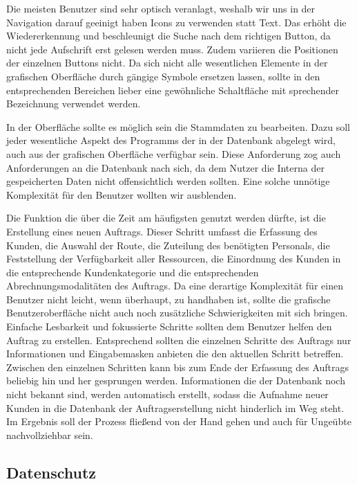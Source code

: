 \documentclass[12pt]{article}
\begin{document}
Die meisten Benutzer sind sehr optisch veranlagt, weshalb wir uns in der Navigation darauf geeinigt haben Icons zu verwenden statt Text. Das erhöht die Wiedererkennung und beschleunigt die Suche nach dem richtigen Button, da nicht jede Aufschrift erst gelesen werden muss. Zudem variieren die Positionen der einzelnen Buttons nicht. Da sich nicht alle wesentlichen Elemente in der grafischen Oberfläche durch gängige Symbole ersetzen lassen, sollte in den entsprechenden Bereichen lieber eine gewöhnliche Schaltfläche mit sprechender Bezeichnung verwendet werden.
\newline

In der Oberfläche sollte es möglich sein die Stammdaten zu bearbeiten. Dazu soll jeder wesentliche Aspekt des Programms der in der Datenbank abgelegt wird, auch aus der grafischen Oberfläche verfügbar sein. Diese Anforderung zog auch Anforderungen an die Datenbank nach sich, da dem Nutzer die Interna der gespeicherten Daten nicht offensichtlich werden sollten. Eine solche unnötige Komplexität für den Benutzer wollten wir ausblenden.
\newline

Die Funktion die über die Zeit am häufigsten genutzt werden dürfte, ist die Erstellung eines neuen Auftrags. Dieser Schritt umfasst die Erfassung des Kunden, die Auswahl der Route, die Zuteilung des benötigten Personals, die Feststellung der Verfügbarkeit aller Ressourcen, die Einordnung des Kunden in die entsprechende Kundenkategorie und die entsprechenden Abrechnungsmodalitäten des Auftrags. Da eine derartige Komplexität für einen Benutzer nicht leicht, wenn überhaupt, zu handhaben ist, sollte die grafische Benutzeroberfläche nicht auch noch zusätzliche Schwierigkeiten mit sich bringen. Einfache Lesbarkeit und fokussierte Schritte sollten dem Benutzer helfen den Auftrag zu erstellen. Entsprechend sollten die einzelnen Schritte des Auftrags nur Informationen und Eingabemasken anbieten die den aktuellen Schritt betreffen. Zwischen den einzelnen Schritten kann bis zum Ende der Erfassung des Auftrags beliebig hin und her gesprungen werden. Informationen die der Datenbank noch nicht bekannt sind, werden automatisch erstellt, sodass die Aufnahme neuer Kunden in die Datenbank der Auftragserstellung nicht hinderlich im Weg steht. Im Ergebnis soll der Prozess fließend von der Hand gehen und auch für Ungeübte nachvollziehbar sein.

\subsection{Datenschutz}
\end{document}
